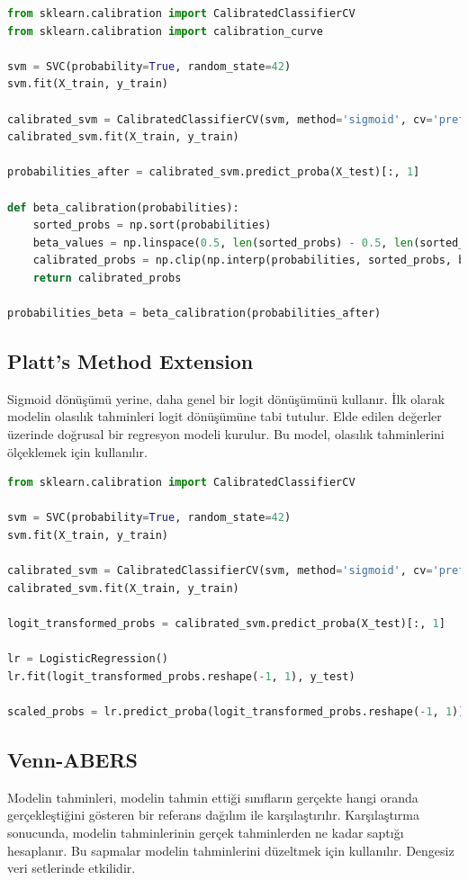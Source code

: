 \begin{lstlisting}[language=Python, caption=Scikit-learn'de Beta Calibration örneği.]
from sklearn.calibration import CalibratedClassifierCV
from sklearn.calibration import calibration_curve

svm = SVC(probability=True, random_state=42)
svm.fit(X_train, y_train)

calibrated_svm = CalibratedClassifierCV(svm, method='sigmoid', cv='prefit')
calibrated_svm.fit(X_train, y_train)

probabilities_after = calibrated_svm.predict_proba(X_test)[:, 1]

def beta_calibration(probabilities):
    sorted_probs = np.sort(probabilities)
    beta_values = np.linspace(0.5, len(sorted_probs) - 0.5, len(sorted_probs)) / len(sorted_probs)
    calibrated_probs = np.clip(np.interp(probabilities, sorted_probs, beta_values), 0, 1)
    return calibrated_probs

probabilities_beta = beta_calibration(probabilities_after)
\end{lstlisting}

\subsection{Platt's Method Extension}
Sigmoid dönüşümü yerine, daha genel bir logit dönüşümünü kullanır. İlk olarak modelin olasılık tahminleri logit dönüşümüne tabi tutulur. Elde edilen değerler üzerinde doğrusal bir regresyon modeli kurulur. Bu model, olasılık tahminlerini ölçeklemek için kullanılır.

\begin{lstlisting}[language=Python, caption=Scikit-learn'de Platt's Method örneği.]
from sklearn.calibration import CalibratedClassifierCV

svm = SVC(probability=True, random_state=42)
svm.fit(X_train, y_train)

calibrated_svm = CalibratedClassifierCV(svm, method='sigmoid', cv='prefit')
calibrated_svm.fit(X_train, y_train)

logit_transformed_probs = calibrated_svm.predict_proba(X_test)[:, 1] 

lr = LogisticRegression()
lr.fit(logit_transformed_probs.reshape(-1, 1), y_test)

scaled_probs = lr.predict_proba(logit_transformed_probs.reshape(-1, 1))[:, 1]
\end{lstlisting}

\subsection{Venn-ABERS}
Modelin tahminleri, modelin tahmin ettiği sınıfların gerçekte hangi oranda gerçekleştiğini gösteren bir referans dağılım ile karşılaştırılır. Karşılaştırma sonucunda, modelin tahminlerinin gerçek tahminlerden ne kadar saptığı hesaplanır. Bu sapmalar modelin tahminlerini düzeltmek için kullanılır. Dengesiz veri setlerinde etkilidir.

